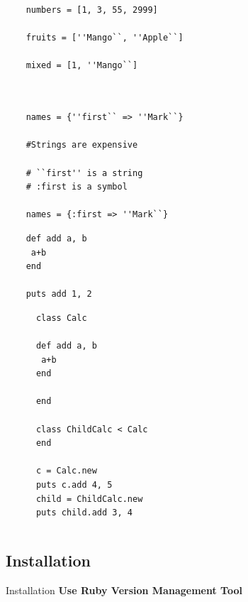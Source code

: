 \documentclass[xcolor=svgnames]{beamer}
\newcommand\Fontvi{\fontsize{30}{7.2}\selectfont}
\begin{document}
\begin{frame}[fragile]
\begin{columns}[c]
\begin{overprint}
\begin{verbatim}
	numbers = [1, 3, 55, 2999]
	
	fruits = [''Mango``, ''Apple``]
	
	mixed = [1, ''Mango``]
      \end{verbatim}
      \begin{verbatim}
	
	
	names = {''first`` => ''Mark``} 

	#Strings are expensive

	# ``first'' is a string
	# :first is a symbol
	
	names = {:first => ''Mark``}
      \end{verbatim}
      \begin{verbatim}
	def add a, b
	 a+b
	end

	puts add 1, 2
      \end{verbatim}

      \begin{verbatim}
      class Calc

      def add a, b
       a+b
      end
      
      end

      class ChildCalc < Calc
      end

      c = Calc.new
      puts c.add 4, 5
      child = ChildCalc.new
      puts child.add 3, 4
    \end{verbatim}

    \end{overprint}
\end{columns}
\end{frame}
\subsection{Installation}

\begin{frame}[c]{Installation}
\transwipe
  \textbf{Use Ruby Version Management Tool} \\
  \bigskip
  \begin{center}
  \uncover<2->{\Fontvi \color{Maroon}{RVM or rbenv}}
  \end{center}
\end{frame}
\end{document}

